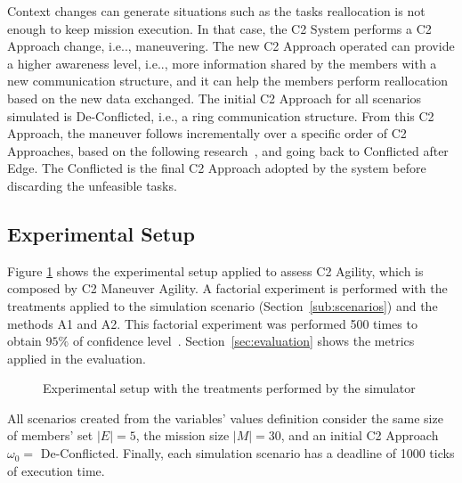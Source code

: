 Context changes can generate situations such as the tasks reallocation is not enough to keep mission execution. In that case, the C2 System performs a C2 Approach change, i.e.., maneuvering. The new C2 Approach operated can provide a higher awareness level, i.e.., more information shared by the members with a new communication structure, and it can help the members perform reallocation based on the new data exchanged. The initial C2 Approach for all scenarios simulated is De-Conflicted, i.e., a ring communication structure. From this C2 Approach, the maneuver follows incrementally over a specific order of C2 Approaches, based on the following research~\cite{france2014}, and going back to Conflicted after Edge. The Conflicted is the final C2 Approach adopted by the system before discarding the unfeasible tasks.

\subsection{Experimental Setup}
\label{sub:setup}

Figure \ref{fig:exp_setup} shows the experimental setup applied to assess C2 Agility, which is composed by C2 Maneuver Agility. A factorial experiment is performed with the treatments applied to the simulation scenario (Section~\ref{sub:scenarios}) and the methods A1 and A2. This factorial experiment was performed 500 times to obtain $95\%$ of confidence level~\cite{CochranW.G.1983}. Section~\ref{sec:evaluation} shows the metrics applied in the evaluation.

\begin{figure}[ht!]
    \centering
    \scalebox{.65}{}
    \caption{Experimental setup with the treatments performed by the simulator}
    \label{fig:exp_setup}
\end{figure}

All scenarios created from the variables' values definition consider the same size of members' set $|E|=5$, the mission size $|M|=30$, and an initial C2 Approach $\omega_0 =$ De-Conflicted. Finally, each simulation scenario has a deadline of 1000 ticks of execution time.



